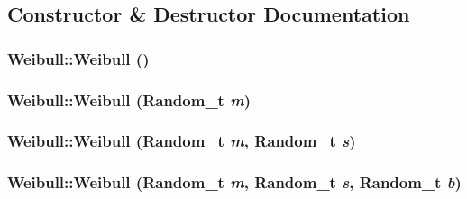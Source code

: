 \subsection{Constructor \& Destructor Documentation}
\hypertarget{classWeibull_1ef56bcb370b049213cff29e69a56cbb}{
\subsubsection[{Weibull}]{\setlength{\rightskip}{0pt plus 5cm}Weibull::Weibull ()}}
\label{classWeibull_1ef56bcb370b049213cff29e69a56cbb}


\hypertarget{classWeibull_87b112d5cdec757dfdc6536f7f0f5967}{
\subsubsection[{Weibull}]{\setlength{\rightskip}{0pt plus 5cm}Weibull::Weibull ({\bf Random\_\-t} {\em m})}}
\label{classWeibull_87b112d5cdec757dfdc6536f7f0f5967}


\hypertarget{classWeibull_98abce0e27e7b59e95279624e2e4329f}{
\subsubsection[{Weibull}]{\setlength{\rightskip}{0pt plus 5cm}Weibull::Weibull ({\bf Random\_\-t} {\em m}, \/  {\bf Random\_\-t} {\em s})}}
\label{classWeibull_98abce0e27e7b59e95279624e2e4329f}


\hypertarget{classWeibull_36854546a5299757bd15400317568955}{
\subsubsection[{Weibull}]{\setlength{\rightskip}{0pt plus 5cm}Weibull::Weibull ({\bf Random\_\-t} {\em m}, \/  {\bf Random\_\-t} {\em s}, \/  {\bf Random\_\-t} {\em b})}}
\label{classWeibull_36854546a5299757bd15400317568955}


